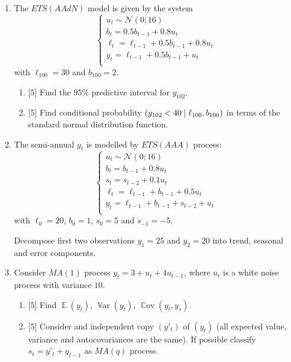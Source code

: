 \documentclass[12pt]{article}
\DeclareMathOperator{\Cov}{\mathbb{C}ov}
\DeclareMathOperator{\Var}{\mathbb{V}ar}
\let\P\relax
\DeclareMathOperator{\P}{\mathbb{P}}
\DeclareMathOperator{\E}{\mathbb{E}}
\newcommand{\cN}{\mathcal{N}}
\begin{document}


\begin{enumerate}
\item   The $ETS(AAdN)$ model is given by the system
  \[
  \begin{cases}
  u_t  \sim \cN(0; 16) \\
  b_t = 0.5 b_{t-1} + 0.8 u_t \\
  \ell_t = \ell_{t-1} + 0.5 b_{t-1} + 0.8 u_t \\
  y_t = \ell_{t-1} + 0.5 b_{t-1} + u_t \\
  \end{cases}
  \]
  with $\ell_{100} = 30$ and $b_{100} = 2$.
\begin{enumerate}
  \item {[5]} Find the 95\% predictive interval for $y_{102}$.
  \item {[5]} Find conditional probability $\P(y_{102} < 40  \mid \ell_{100}, b_{100})$ in terms of the standard normal distribution function.
\end{enumerate}
\item   The semi-annual $y_t$ is modelled by $ETS(AAA)$ process:    
    \[
    \begin{cases}
        u_t \sim \cN(0; 16) \\
        b_t = b_{t-1} + 0.8 u_t \\
        s_t = s_{t-2} + 0.1 u_t \\
        \ell_t = \ell_{t-1} + b_{t-1} + 0.5 u_t \\
        y_t = \ell_{t-1} + b_{t-1} + s_{t-2} + u_t \\
    \end{cases}    
    \]
with $\ell_0 = 20$, $b_0 = 1$, $s_0 = 5$ and $s_{-1} = -5$.

Decompose first two observations $y_1 = 25$ and $y_2 = 20$ into trend, seasonal and error components.

\item Consider $MA(1)$ process $y_t = 3 + u_t + 4 u_{t-1}$, where $u_t$ is a white noise process with variance $10$.
\begin{enumerate}
    \item {[5]} Find $\E(y_t)$, $\Var(y_t)$, $\Cov(y_t, y_s)$.
    \item {[5]} Consider and independent copy $(y'_t)$ of $(y_t)$ (all expected value, variance and autocovariances are the same).
    If possible classify $s_t = y'_t + y_{t-1}$ as $MA(q)$ process. 
\end{enumerate}


\end{enumerate}
\end{document}
